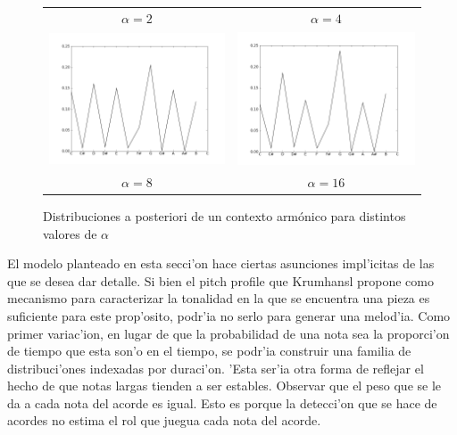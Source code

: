 \begin{figure}[htp]
\begin{center}
\begin{tabular}{cc}
        $\alpha=2$ & $\alpha=4$ \\
        \includegraphics[width=7.5cm]{images/posteriors/posterior-profile-8.png} &
        \includegraphics[width=7.5cm]{images/posteriors/posterior-profile-16.png} \\
        $\alpha=8$ & $\alpha=16$ \\

        \end{tabular}
        \caption{Distribuciones a posteriori de un contexto arm\'onico para distintos valores de $\alpha$}
        \label{fig:pitch_posteriors}
    \end{center}      
\end{figure}

El modelo planteado en esta secci'on hace ciertas asunciones impl'icitas de las que se desea dar detalle. 
Si bien el pitch profile que Krumhansl propone como mecanismo para caracterizar la tonalidad en la que se encuentra una pieza es suficiente para este prop'osito, 
podr'ia no serlo para generar una melod'ia. Como primer variac'ion, en lugar de que la probabilidad de una nota sea la proporci'on de tiempo que esta son'o en el tiempo, 
se podr'ia construir una familia de distribuci'ones indexadas por duraci'on. 'Esta ser'ia otra forma de reflejar el hecho de que notas largas tienden a ser estables.
Observar que el peso que se le da a cada nota del acorde es igual. Esto es porque la detecci'on que se hace de acordes no estima el rol que juegua cada nota del acorde.

